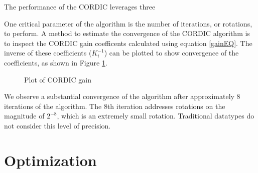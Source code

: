 \documentclass[../report_polarFIR.tex]{subfiles}
\begin{document}
The performance of the CORDIC leverages three 



One critical parameter of the algorithm is the number of iterations, or rotations, to perform. A method to estimate the convergence of the CORDIC algorithm is to inspect the CORDIC gain coefficents calculated using equation \ref{gainEQ}. The inverse of these coefficients ($K_i ^{-1}$) can be plotted to show convergence of the coefficients, as shown in Figure \ref{CORDICcoeffPlot}.

\begin{figure}[h!]
\begin{center}

   \label{CORDICcoeffPlot}
   \caption{Plot of CORDIC gain}
   
\end{center}

\end{figure}
\FloatBarrier

We observe a substantial convergence of the algorithm after approximately 8 iterations of the algorithm. The 8th iteration addresses rotations on the magnitude of $2^{-8}$, which is an extremely small rotation. Traditional  datatypes do not consider this level of precision.

\section{Optimization}
\end{document}
